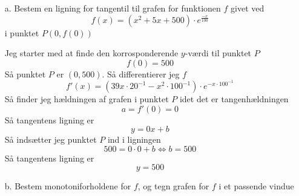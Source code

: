 \documentclass[12pt]{article}
\begin{document}
\begin{enumerate}

        \item[a.] Bestem en ligning for tangentil til grafen for funktionen $f$ givet ved
                $$f(x) = (x^2 + 5x + 500)\cdot e^{\frac{-x}{100}}$$
                i punktet $P(0, f(0))$

                Jeg starter med at finde den korrosponderende $y$-værdi til punktet $P$
                $$f(0) = 500$$
                Så punktet $P$ er $(0, 500)$. Så differentierer jeg $f$
                $$f'(x) = (39x\cdot 20^{-1}-x^2\cdot 100^{-1})\cdot e^{-x\cdot 100^{-1}}$$
                Så finder jeg hældningen af grafen i punktet $P$ idet det er
                tangenhældningen
                $$a = f'(0) = 0$$
                Så tangentens ligning er
                $$y = 0x+b$$
                Så indsætter jeg punktet $P$ ind i ligningen
                $$500 = 0\cdot 0 + b \Leftrightarrow b = 500$$
                Så tangentens ligning er
                $$y = 500$$

        \item[b.] Bestem monotoniforholdene for $f$, og tegn grafen for $f$ i et
                passende vindue


\end{enumerate}
\end{document}
